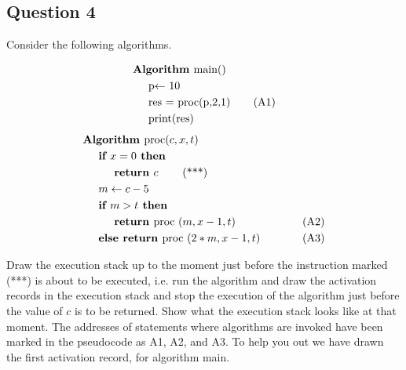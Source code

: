 \documentclass[12pt]{article}
\begin{document}
    \subsection*{Question 4}
    Consider the following algorithms.
    \begin{multicols}{2}
    \begin{align*}
        &\textbf{Algorithm }\text{main()}\\
        &\hspace*{5mm}\text{p$\leftarrow$ 10}\\
        &\hspace*{5mm}\text{res = proc(p,2,1)   \hspace*{5mm}  (A1)}\\
        &\hspace*{5mm}\text{print(res)}
    \end{align*}
    \columnbreak{}
    \begin{align*}
        &\textbf{Algorithm }\text{proc($c,x,t$)}\\
        &\hspace*{5mm}\textbf{if $x = 0$ then}\\
        &\hspace*{10mm}\textbf{return $c$ \hspace*{5mm}  }\text{(***)}\\
        &\hspace*{5mm}\text{$m \leftarrow c - 5$}\\
        &\hspace*{5mm}\textbf{if $m > t$ then}\\
        &\hspace*{10mm}\textbf{return \normalfont{proc} $(m,x-1,t)$}\hspace*{10mm}&\text{(A2)}\\
        &\hspace*{5mm}\textbf{else return \normalfont{proc} $(2*m,x-1,t)$}\hspace*{10mm}&\text{(A3)}
    \end{align*}
    \end{multicols}

    Draw the execution stack up to the moment just before the instruction marked (***) is about to be
    executed, i.e. run the algorithm and draw the activation records in the execution stack and stop the
    execution of the algorithm just before the value of $c$ is to be returned. Show what the execution
    stack looks like at that moment. The addresses of statements where algorithms are invoked have been
    marked in the pseudocode as A1, A2, and A3. To help you out we have drawn the first activation
    record, for algorithm main.
\end{document}
